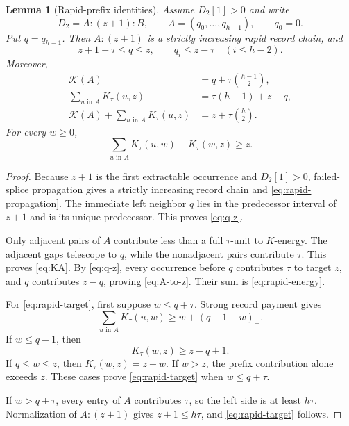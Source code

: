 \documentclass[11pt]{article}
\newtheorem{lemma}[theorem]{Lemma}
\theoremstyle{definition}
\theoremstyle{remark}
\newcommand{\kap}{\mathcal K}
\begin{document}
\begin{lemma}[Rapid-prefix identities]
\label{lem:rapid-identities}
Assume $D_2[1]>0$ and write
\[
 D_2=A:(z+1):B,
 \qquad
 A=(q_0,\ldots,q_{h-1}),
 \qquad q_0=0.
\]
Put $q=q_{h-1}$.  Then $A:(z+1)$ is a strictly increasing rapid record
chain, and
\begin{equation}
 z+1-\tau\le q\le z,
 \qquad
 q_i\le z-\tau\quad(i\le h-2).
 \label{eq:q-z}
\end{equation}
Moreover,
\begin{align}
 \kap(A)&=q+\tau\binom{h-1}{2},
 \label{eq:KA}\\
 \sum_{u\text{ in }A}K_\tau(u,z)
 &=\tau(h-1)+z-q,
 \label{eq:A-to-z}\\
 \kap(A)+\sum_{u\text{ in }A}K_\tau(u,z)
 &=z+\tau\binom h2.
 \label{eq:rapid-energy}
\end{align}
For every $w\ge0$,
\begin{equation}
 \sum_{u\text{ in }A}K_\tau(u,w)+K_\tau(w,z)\ge z.
 \label{eq:rapid-target}
\end{equation}
\end{lemma}

\begin{proof}
Because $z+1$ is the first extractable occurrence and $D_2[1]>0$,
failed-splice propagation gives a strictly increasing record chain and
\eqref{eq:rapid-propagation}.  The immediate left neighbor $q$ lies in
the predecessor interval of $z+1$ and is its unique predecessor.  This
proves \eqref{eq:q-z}.

Only adjacent pairs of $A$ contribute less than a full $\tau$-unit to
$K$-energy.  The adjacent gaps telescope to $q$, while the nonadjacent
pairs contribute $\tau$.  This proves \eqref{eq:KA}.  By
\eqref{eq:q-z}, every occurrence before $q$ contributes $\tau$ to target
$z$, and $q$ contributes $z-q$, proving \eqref{eq:A-to-z}.  Their sum is
\eqref{eq:rapid-energy}.

For \eqref{eq:rapid-target}, first suppose $w\le q+\tau$.  Strong record
payment gives
\[
 \sum_{u\text{ in }A}K_\tau(u,w)
 \ge w+(q-1-w)_+.
\]
If $w\le q-1$, then
\[
 K_\tau(w,z)\ge z-q+1.
\]
If $q\le w\le z$, then $K_\tau(w,z)=z-w$.  If $w>z$, the prefix
contribution alone exceeds $z$.  These cases prove
\eqref{eq:rapid-target} when $w\le q+\tau$.

If $w>q+\tau$, every entry of $A$ contributes $\tau$, so the left side
is at least $h\tau$.  Normalization of $A:(z+1)$ gives
$z+1\le h\tau$, and \eqref{eq:rapid-target} follows.
\end{proof}
\end{document}
